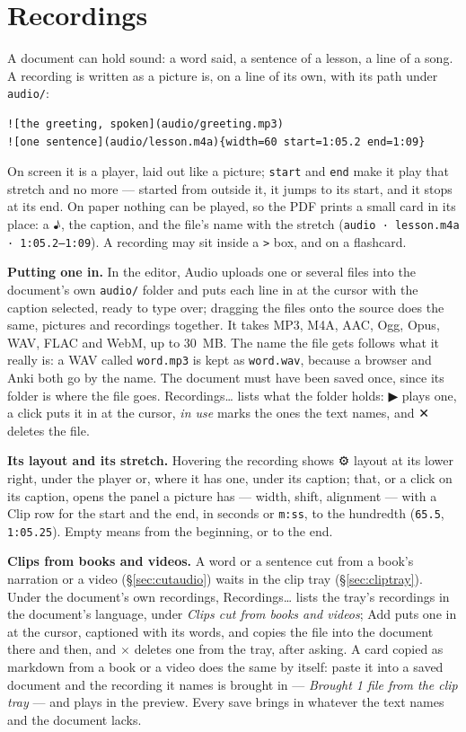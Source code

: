 \documentclass[11pt,oneside]{report}
\newcommand{\sym}[1]{{\symfont #1}}
\newcommand{\file}[1]{\texttt{#1}}
\newcommand{\menu}[1]{\textsf{#1}}
\begin{document}
\section{Recordings}
\label{sec:recordings}

A document can hold sound: a word said, a sentence of a lesson, a line of a
song. A recording is written as a picture is, on a line of its own, with its
path under \file{audio/}:

\begin{lstlisting}
![the greeting, spoken](audio/greeting.mp3)
![one sentence](audio/lesson.m4a){width=60 start=1:05.2 end=1:09}
\end{lstlisting}

On screen it is a player, laid out like a picture; \texttt{start} and
\texttt{end} make it play that stretch and no more --- started from outside
it, it jumps to its start, and it stops at its end. On paper nothing can be
played, so the PDF prints a small card in its place: a \sym{♪},
the caption, and the file's name with the stretch
(\texttt{audio · lesson.m4a · 1:05.2--1:09}). A recording may sit inside a
\texttt{>} box, and on a flashcard.

\textbf{Putting one in.} In the editor, \menu{Audio} uploads one or several
files into the document's own \file{audio/} folder and puts each line in at
the cursor with the caption selected, ready to type over; dragging the
files onto the source does the same, pictures and recordings together. It
takes MP3, M4A, AAC, Ogg, Opus, WAV, FLAC and WebM, up to 30~MB. The name
the file gets follows what it really is: a WAV called \file{word.mp3} is
kept as \file{word.wav}, because a browser and Anki both go by the name. The
document must have been saved once, since its folder is where the file
goes. \menu{Recordings\ldots} lists what the folder holds: \sym{▶} plays
one, a click puts it in at the cursor, \emph{in use} marks the ones the
text names, and \sym{✕} deletes the file.

\textbf{Its layout and its stretch.} Hovering the recording shows
\menu{\sym{⚙} layout} at its lower right, under the player or, where it has
one, under its caption; that, or a click on its
caption, opens the panel a picture has --- width, shift, alignment --- with a
\menu{Clip} row for the start and the end, in seconds or \texttt{m:ss}, to
the hundredth (\texttt{65.5}, \texttt{1:05.25}). Empty means from the
beginning, or to the end.

\textbf{Clips from books and videos.} A word or a sentence cut from a book's
narration or a video (\S\ref{sec:cutaudio}) waits in the clip tray
(\S\ref{sec:cliptray}). Under the document's own recordings,
\menu{Recordings\ldots} lists the tray's recordings in the document's
language, under \emph{Clips cut from books and videos}; \menu{Add} puts
one in at the cursor, captioned with its words, and copies the file into
the document there and then, and \menu{$\times$} deletes one from the tray,
after asking. A card copied as markdown from a book or a
video does the same by itself: paste it into a saved document and the
recording it names is brought in --- \emph{Brought 1 file from the clip
tray} --- and plays in the preview. Every save brings in whatever the text
names and the document lacks.
\end{document}
